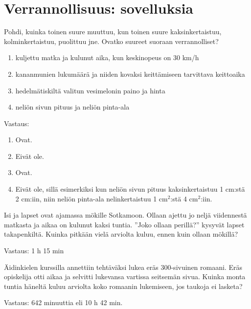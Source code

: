 
\chapter{Verrannollisuus: sovelluksia}

\begin{tehtava}
    Pohdi, kuinka toinen suure muuttuu, kun toinen suure kaksinkertaistuu,
    kolminkertaistuu, puolittuu jne. Ovatko suureet suoraan verrannolliset?
    
    \begin{enumerate}
        \item kuljettu matka ja kulunut aika, kun keskinopeus on 30 km/h
        \item kananmunien lukumäärä ja niiden kovaksi keittämiseen tarvittava keittoaika
        \item hedelmätiskiltä valitun vesimelonin paino ja hinta
        \item neliön sivun pituus ja neliön pinta-ala
    \end{enumerate}
    
    \begin{vastaus}
        Vastaus:
        \begin{enumerate}
            \item Ovat.
            \item Eivät ole.
            \item Ovat.
            \item Eivät ole, sillä esimerkiksi kun neliön sivun pituus
                kaksinkertaistuu 1 cm:stä 2 cm:iin, niin neliön pinta-ala
                nelinkertaistuu 1 cm$^2$:stä 4 cm$^2$:iin.
        \end{enumerate}
    \end{vastaus}
\end{tehtava}

\begin{tehtava}
    Isi ja lapset ovat ajamassa mökille Sotkamoon. Ollaan ajettu jo neljä
    viidennestä matkasta ja aikaa on kulunut kaksi tuntia. ''Joko ollaan perillä?''
    kysyvät lapset takapenkiltä. Kuinka pitkään vielä arviolta kuluu, ennen
    kuin ollaan mökillä?
    
    \begin{vastaus}
        Vastaus: 1 h 15 min
    \end{vastaus}
\end{tehtava}

\begin{tehtava}
    Äidinkielen kurssilla annettiin tehtäväksi lukea eräs 300-sivuinen romaani.
    Eräs opiskelija otti aikaa ja selvitti lukevansa vartissa seitsemän sivua.
    Kuinka monta tuntia häneltä kuluu arviolta koko romaanin lukemiseen, jos
    taukoja ei lasketa?
    
    \begin{vastaus}
        Vastaus: 642 minuuttia eli 10 h 42 min.
    \end{vastaus}
\end{tehtava}
